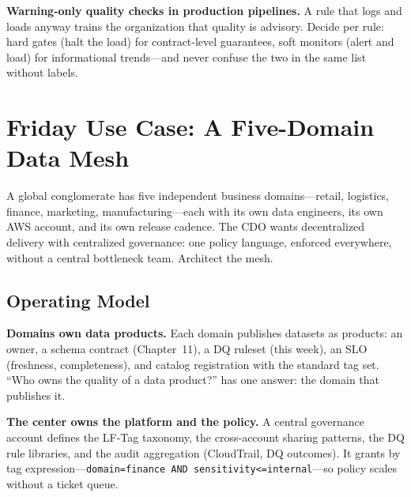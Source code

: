 \begin{pitfall}
\textbf{Warning-only quality checks in production pipelines.} A rule that logs and loads anyway trains the organization that quality is advisory. Decide per rule: hard gates (halt the load) for contract-level guarantees, soft monitors (alert and load) for informational trends---and never confuse the two in the same list without labels.
\end{pitfall}

\section{Friday Use Case: A Five-Domain Data Mesh}
A global conglomerate has five independent business domains---retail, logistics, finance, marketing, manufacturing---each with its own data engineers, its own AWS account, and its own release cadence. The CDO wants decentralized delivery with centralized governance: one policy language, enforced everywhere, without a central bottleneck team. Architect the mesh.

\subsection{Operating Model}
\textbf{Domains own data products.} Each domain publishes datasets as products: an owner, a schema contract (Chapter~11), a DQ ruleset (this week), an SLO (freshness, completeness), and catalog registration with the standard tag set. ``Who owns the quality of a data product?'' has one answer: the domain that publishes it.

\textbf{The center owns the platform and the policy.} A central governance account defines the LF-Tag taxonomy, the cross-account sharing patterns, the DQ rule libraries, and the audit aggregation (CloudTrail, DQ outcomes). It grants by tag expression---\texttt{domain=finance AND sensitivity<=internal}---so policy scales without a ticket queue.

